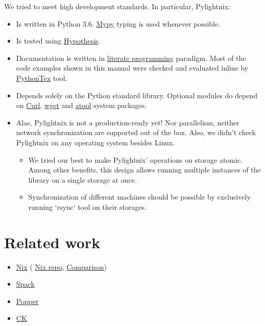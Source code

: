 \documentclass{article}
\begin{document}
We tried to meet high development standards. In particular, Pylightnix:
\begin{itemize}
  \item Is written in Python 3.6. \href{http://mypy-lang.org/}{Mypy} typing is
    used whenever possible.
  \item Is tested using \href{https://pypi.org/project/hypothesis/}{Hypothesis}.
  \item Documentation is written in
    \href{https://en.wikipedia.org/wiki/Literate_programming}{literate
    programming} paradigm. Most of the code examples shown in this manual were
    checked and evaluated inline by
    \href{https://github.com/gpoore/pythontex}{PythonTex} tool.
  \item Depends solely on the Python standard library. Optional modules
    do depend on \href{https://curl.se/}{Curl},
    \href{https://www.gnu.org/software/wget/}{wget} and
    \href{https://www.nongnu.org/atool/}{atool} system packages.
  \item Alas, Pylightnix is not a production-ready yet! Nor parallelism, neither
    network synchronization are supported out of the box. Also, we didn't check
    Pylightnix on any operating system besides Linux.
    \begin{itemize}
      \item We tried our best to make Pylightnix' operations on storage atomic.
        Among other benefits, this design allows running multiple instances of
        the library on a single storage at once.
      \item Synchronization of different machines should be possible by
        exclusively running `rsync` tool on their storages.
    \end{itemize}
\end{itemize}

\section{Related work}

\begin{itemize}
  \item \href{https://nixos.org}{Nix} (
    \href{https://github.com/nixos/nix}{Nix repo},
    \href{./Comparison.md#Pylightnix-vs-Nix}{Comparison})
  \item \href{https://spack.io}{Spack}
  \item \href{https://falsifiable.us}{Popper}
  \item \href{https://cknowledge.org}{CK}
\end{itemize}
\end{document}
